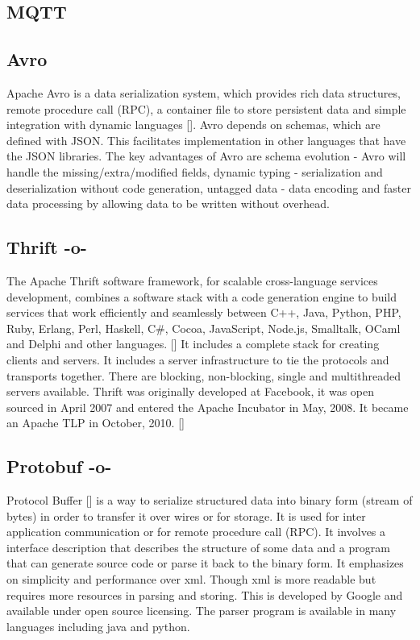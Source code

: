 \subsection{MQTT}

\subsection{Avro}

Apache Avro is a data serialization system, which provides rich data
structures, remote procedure call (RPC), a container file to store
persistent data and simple integration with dynamic
languages [\cite{www-Avro}].  Avro depends on schemas, which are defined
with JSON. This facilitates implementation in other languages that
have the JSON libraries.  The key advantages of Avro are schema
evolution - Avro will handle the missing/extra/modified fields,
dynamic typing - serialization and deserialization without code
generation, untagged data - data encoding and faster data processing
by allowing data to be written without overhead.
     
\subsection{Thrift -o-}

The Apache Thrift software framework, for scalable cross-language
services development, combines a software stack with a code generation
engine to build services that work efficiently and seamlessly between
C++, Java, Python, PHP, Ruby, Erlang, Perl, Haskell, C\#, Cocoa,
JavaScript, Node.js, Smalltalk, OCaml and Delphi and other
languages. [\cite{paper-thrift}] It includes a complete stack for
creating clients and servers. It includes a server infrastructure to
tie the protocols and transports together. There are blocking,
non-blocking, single and multithreaded servers available.  Thrift was
originally developed at Facebook, it was open sourced in April 2007
and entered the Apache Incubator in May, 2008. It became an Apache TLP
in October, 2010. [\cite{www-thrift}]
     
\subsection{Protobuf -o-}

Protocol Buffer [\cite{www-protobuf}] is a way to serialize structured
data into binary form (stream of bytes) in order to transfer it over
wires or for storage. It is used for inter application communication
or for remote procedure call (RPC). It involves a interface
description that describes the structure of some data and a program
that can generate source code or parse it back to the binary form. It
emphasizes on simplicity and performance over xml. Though xml is more
readable but requires more resources in parsing and storing.  This is
developed by Google and available under open source licensing. The
parser program is available in many languages including java and
python.




